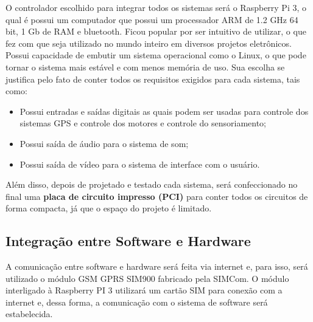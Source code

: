 O controlador escolhido para integrar todos os sistemas será o Raspberry Pi 3, o qual é possui um computador que possui um processador ARM de 1.2 GHz 64 bit, 1 Gb de RAM e bluetooth. Ficou popular por ser intuitivo de utilizar, o que fez com que seja utilizado no mundo inteiro em diversos projetos eletrônicos. Possui capacidade de embutir um sistema operacional como o Linux, o que pode tornar o sistema mais estável e com menos memória de uso. Sua escolha se justifica pelo fato de conter todos os requisitos exigidos para cada sistema, tais como:

\begin{itemize}
  \item Possui entradas e saídas digitais as quais podem ser usadas para controle dos sistemas GPS e controle dos motores e controle do sensoriamento;
  \item Possui saída de áudio para o sistema de som; 
  \item Possui saída de vídeo para o sistema de interface com o usuário.
\end{itemize}

Além disso, depois de projetado e testado cada sistema, será confeccionado no final uma \textbf{placa de circuito impresso (PCI)} para conter todos os circuitos de forma compacta, já que o espaço do projeto é limitado.

\subsection{Integração entre Software e Hardware}
A comunicação entre software e hardware será feita via internet e, para isso, será utilizado o módulo GSM GPRS SIM900 fabricado pela SIMCom. O módulo interligado à Raspberry PI 3 utilizará um cartão SIM para conexão com a internet e, dessa forma, a comunicação com o sistema de software será estabelecida.


